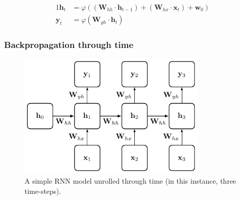 \documentclass[xcolor={table}]{beamer}
\begin{document}
 \begin{frame} 
\begin{alignat}{1}
\mathbf{h}_t &= \varphi\left(\left(\mathbf{W}_{hh} \cdot \mathbf{h}_{t-1}\right) + \left(\mathbf{W}_{hx} \cdot \mathbf{x}_t \right) + \mathbf{w}_0\right) \label{eq:rnnhidden}\\
\mathbf{y}_t &= \varphi\left(\mathbf{W}_{yh} \cdot \mathbf{h}_t \right) \label{eq:rnnoutput}
\end{alignat}
\end{frame} 

\subsubsection{Backpropagation through time}

 \begin{frame} 
\begin{figure}[t]
\centerline{
\includegraphics[width=0.8\textwidth]{./images/fmlpda_8_38.pdf}
}
\caption[A simple RNN model unrolled through time (in this instance, three time-steps).]{A simple RNN model unrolled through time (in this instance, three time-steps).}
\label{fig:rnn-unrolledthroughtime}
\end{figure}
\end{frame} 
\end{document}
